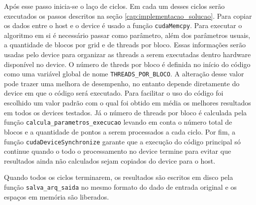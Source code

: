 Após esse passo inicia-se o laço de ciclos. Em cada um desses ciclos serão executados os passos descritos na seção \ref{cap:implementacao_solucao}. Para copiar os dados entre o host e o device é usado a função \texttt{cudaMemcpy}. Para executar o algoritmo em si é necessário passar como parâmetro, além dos parâmetros usuais, a quantidade de blocos por grid e de threads por bloco. Essas informações serão usadas pelo device para organizar as threads a serem executadas dentro hardware disponível no device. O número de threds por bloco é definida no início do código como uma variável global de nome \texttt{THREADS\_POR\_BLOCO}. A alteração desse valor pode trazer uma melhora de desempenho, no entanto depende diretamente do device em que o código será executado. Para facilitar o uso do código foi escolhido um valor padrão com o qual foi obtido em média os melhores resultados em todos os devices testados. Já o número de threads por bloco é calculada pela função \texttt{calcula\_parametros\_execucao} levando em conta o número total de blocos e a quantidade de pontos a serem processados a cada ciclo. Por fim, a função \texttt{cudaDeviceSynchronize} garante que a execução do código principal só continue quando o todo o processamento no device termine para evitar que resultados ainda não calculados sejam copiados do device para o host.

Quando todos os ciclos terminarem, os resultados são escritos em disco pela função \texttt{salva\_arq\_saida} no mesmo formato do dado de entrada original e os espaços em memória são liberados.






